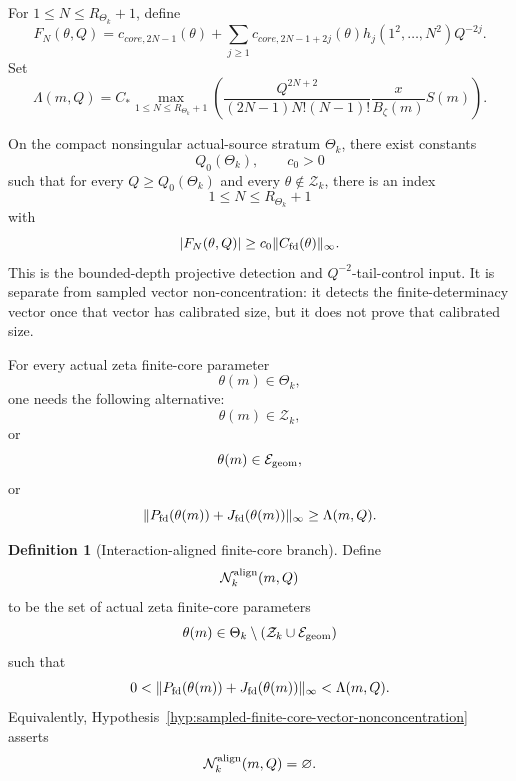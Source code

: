 \documentclass[11pt,a4paper]{amsart}
\def\core{core}%
\theoremstyle{plain}
\theoremstyle{definition}
\newtheorem{definition}[theorem]{Definition}
\newcommand{\core}{\mathrm{core}}
\begin{document}
For \(1\le N\le R_{\Theta_k}+1\), define
\[
F_N(\theta,Q)
=
c_{\core,2N-1}(\theta)
+
\sum_{j\ge1}
c_{\core,2N-1+2j}(\theta)
h_j(1^2,\ldots,N^2)Q^{-2j}.
\]
Set
\[
\Lambda(m,Q)
=
C_*
\max_{1\le N\le R_{\Theta_k}+1}
\left(
\frac{Q^{2N+2}}
{(2N-1)N!(N-1)!}
\frac{x}{B_\zeta(m)}S(m)
\right).
\]

\begin{hypothesis}
\label{hyp:bounded-depth-projective-detection}
On the compact nonsingular actual-source stratum \(\Theta_k\), there exist
constants
\[
Q_0(\Theta_k),\qquad c_0>0
\]
such that for every \(Q\ge Q_0(\Theta_k)\) and every
\(\theta\notin\mathcal Z_k\), there is an index
\[
1\le N\le R_{\Theta_k}+1
\]
with
\[
|F_N(\theta,Q)|
\ge
c_0
\|C_{\rm fd}(\theta)\|_\infty.
\]
This is the bounded-depth projective detection and \(Q^{-2}\)-tail-control
input.  It is separate from sampled vector non-concentration: it detects the
finite-determinacy vector once that vector has calibrated size, but it does
not prove that calibrated size.
\end{hypothesis}

\begin{hypothesis}
\label{hyp:sampled-finite-core-vector-nonconcentration}
For every actual zeta finite-core parameter
\[
\theta(m)\in\Theta_k,
\]
one needs the following alternative:
\[
\theta(m)\in\mathcal Z_k,
\]
or
\[
\theta(m)\in\mathcal E_{\rm geom},
\]
or
\[
\|P_{\rm fd}(\theta(m))+J_{\rm fd}(\theta(m))\|_\infty
\ge
\Lambda(m,Q).
\]
\end{hypothesis}

\begin{definition}[Interaction-aligned finite-core branch]
\label{def:interaction-aligned-finite-core-branch}
Define
\[
\mathcal N_k^{\rm align}(m,Q)
\]
to be the set of actual zeta finite-core parameters
\[
\theta(m)\in\Theta_k\setminus(\mathcal Z_k\cup\mathcal E_{\rm geom})
\]
such that
\[
0<
\|P_{\rm fd}(\theta(m))+J_{\rm fd}(\theta(m))\|_\infty
<
\Lambda(m,Q).
\]
Equivalently, Hypothesis~\ref{hyp:sampled-finite-core-vector-nonconcentration}
asserts
\[
\mathcal N_k^{\rm align}(m,Q)=\varnothing.
\]
\end{definition}
\end{document}

